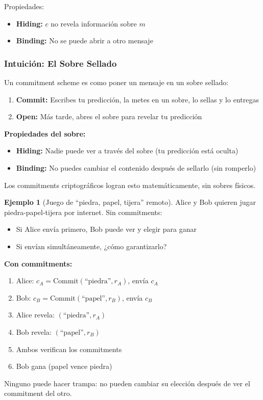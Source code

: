 \documentclass[11pt,a4paper,twoside,openright]{book}
\theoremstyle{definition}
\newtheorem{example}{Ejemplo}[chapter]
\theoremstyle{plain}
\theoremstyle{remark}
\begin{document}
Propiedades:
\begin{itemize}
    \item \textbf{Hiding:} $c$ no revela información sobre $m$
    \item \textbf{Binding:} No se puede abrir a otro mensaje
\end{itemize}

\subsubsection{Intuición: El Sobre Sellado}

\begin{intuicion}
Un commitment scheme es como poner un mensaje en un sobre sellado:
\begin{enumerate}
    \item \textbf{Commit:} Escribes tu predicción, la metes en un sobre, lo sellas y lo entregas
    \item \textbf{Open:} Más tarde, abres el sobre para revelar tu predicción
\end{enumerate}

\textbf{Propiedades del sobre:}
\begin{itemize}
    \item \textbf{Hiding:} Nadie puede ver a través del sobre (tu predicción está oculta)
    \item \textbf{Binding:} No puedes cambiar el contenido después de sellarlo (sin romperlo)
\end{itemize}

Los commitments criptográficos logran esto matemáticamente, sin sobres físicos.
\end{intuicion}

\begin{example}[Juego de ``piedra, papel, tijera'' remoto]
Alice y Bob quieren jugar piedra-papel-tijera por internet. Sin commitments:
\begin{itemize}
    \item Si Alice envía primero, Bob puede ver y elegir para ganar
    \item Si envían simultáneamente, ¿cómo garantizarlo?
\end{itemize}

\textbf{Con commitments:}
\begin{enumerate}
    \item Alice: $c_A = \text{Commit}(\text{``piedra''}, r_A)$, envía $c_A$
    \item Bob: $c_B = \text{Commit}(\text{``papel''}, r_B)$, envía $c_B$
    \item Alice revela: $(\text{``piedra''}, r_A)$
    \item Bob revela: $(\text{``papel''}, r_B)$
    \item Ambos verifican los commitments
    \item Bob gana (papel vence piedra)
\end{enumerate}

Ninguno puede hacer trampa: no pueden cambiar su elección después de ver el commitment del otro.
\end{example}
\end{document}
